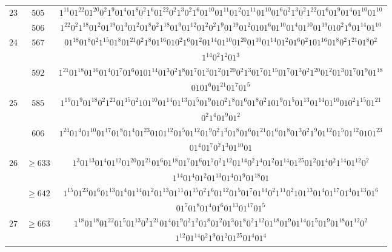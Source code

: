 \documentclass[final,3p,times]{elsarticle}
\theoremstyle{definition}
\begin{document}
\begin{appendix}
{\begin{longtable}[c]{|c|c|c|}
\hline
$23$ & $505$ & $1^{11}01^{22}01^{20}0^{2}1^{9}01^{4}01^{8}0^{2}1^{6}01^{22}0^{2}1^{3}0^{2}1^{6}01^{10}01^{11}01^{2}01^{11}01^{10}01^{6}0^{2}1^{3}0^{2}1^{22}01^{6}01^{9}01^{4}01^{10}01^{10}$\\[-1ex]
& $506$ & $1^{22}0^{2}1^{18}01^{2}01^{19}01^{3}01^{2}01^{8}0^{2}1^{18}01^{9}01^{12}01^{2}0^{2}1^{9}01^{19}01^{2}0101^{6}01^{10}01^{4}01^{10}01^{19}010^{2}1^{6}01^{14}01^{10}$\\
\hline
$24$ & $567$ & $01^{18}01^{8}0^{2}1^{15}01^{8}01^{21}0^{2}1^{8}01^{16}010^{2}1^{6}01^{2}01^{14}01^{10}01^{20}01^{10}01^{14}01^{2}01^{6}0^{2}101^{16}01^{8}0^{2}1^{21}01^{8}0^{2}$\\[-2ex]
&& $1^{14}0^{2}1^{2}01^{3}$\\[-1ex]
& $592$ & $1^{21}01^{18}01^{16}01^{4}01^{7}01^{6}0101^{14}01^{3}0^{2}1^{8}01^{7}01^{3}01^{2}01^{20}0^{2}1^{3}01^{7}01^{15}01^{7}01^{3}0^{2}1^{20}01^{2}01^{3}01^{7}01^{9}01^{18}$\\[-2ex]
&& $0101^{6}01^{21}01^{7}01^{5}$\\
\hline
$25$ & $585$ & $1^{19}01^{9}01^{18}0^{2}1^{21}01^{15}0^{2}101^{10}01^{14}01^{13}01^{5}01^{9}010^{2}1^{8}01^{6}01^{8}0^{2}101^{9}01^{5}01^{13}01^{14}01^{10}010^{2}1^{15}01^{21}$\\[-2ex]
&& $0^{2}1^{4}01^{9}01^{2}$\\[-1ex]
& $ 606$ & $1^{24}01^{4}01^{10}01^{17}01^{8}01^{4}01^{23}0101^{12}01^{5}01^{12}01^{9}0^{2}1^{3}01^{8}01^{6}01^{21}01^{6}01^{8}01^{3}0^{2}1^{9}01^{12}01^{5}01^{12}0101^{23}$\\[-2ex]
&& $01^{4}01^{7}0^{2}1^{3}01^{10}01$\\
\hline
$26$ & $\geq 633$ & $1^{3}01^{13}01^{4}01^{12}01^{20}01^{21}01^{6}01^{18}01^{7}01^{6}01^{7}0^{2}1^{12}01^{14}0^{2}1^{4}01^{2}01^{14}01^{25}01^{2}01^{4}0^{2}1^{14}01^{12}0^{2}$\\[-2ex]
&& $1^{14}01^{4}01^{2}01^{13}01^{4}01^{9}01^{18}01$\\[-1ex]
& $\geq 642$ & $1^{15}01^{23}01^{6}01^{13}01^{4}01^{14}01^{2}01^{13}01^{11}01^{15}0^{2}1^{6}01^{12}01^{5}01^{7}01^{14}0^{2}1^{11}0^{2}101^{13}01^{4}01^{17}01^{4}01^{13}01^{6}$\\[-2ex]
&& $01^{7}01^{8}01^{4}01^{6}01^{13}01^{17}01^{5}$\\
\hline
$27$ & $\geq 663$ & $1^{18}01^{18}01^{22}01^{5}01^{13}0^{2}1^{21}01^{4}01^{9}0^{2}1^{2}01^{8}01^{2}01^{3}01^{8}0^{2}1^{12}01^{18}01^{9}01^{14}01^{5}01^{9}01^{18}01^{12}0^{2}$\\[-2ex]
&& $1^{12}01^{14}0^{2}1^{9}01^{2}01^{25}01^{4}01^{4}$\\[-1ex]

\end{longtable}}
\end{appendix}
\end{document}
